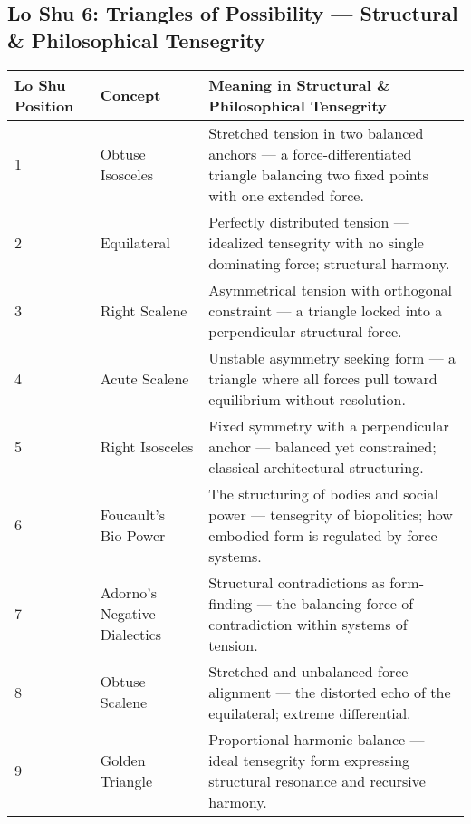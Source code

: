 \documentclass{article}
\begin{document}
\begin{landscape}

\section*{Lo Shu 6: Triangles of Possibility — Structural \& Philosophical Tensegrity}

\renewcommand{\arraystretch}{1.4}

\begin{tabular}{|p{1.8cm}|p{4.5cm}|p{9.5cm}|}
\hline
\textbf{Lo Shu Position} & 
\textbf{Concept} & 
\textbf{Meaning in Structural \& Philosophical Tensegrity} \\
\hline

1 & 
Obtuse Isosceles & 
Stretched tension in two balanced anchors — a force-differentiated triangle balancing two fixed points with one extended force. \\
\hline

2 & 
Equilateral & 
Perfectly distributed tension — idealized tensegrity with no single dominating force; structural harmony. \\
\hline

3 & 
Right Scalene & 
Asymmetrical tension with orthogonal constraint — a triangle locked into a perpendicular structural force. \\
\hline

4 & 
Acute Scalene & 
Unstable asymmetry seeking form — a triangle where all forces pull toward equilibrium without resolution. \\
\hline

5 & 
Right Isosceles & 
Fixed symmetry with a perpendicular anchor — balanced yet constrained; classical architectural structuring. \\
\hline

6 & 
Foucault’s Bio-Power & 
The structuring of bodies and social power — tensegrity of biopolitics; how embodied form is regulated by force systems. \\
\hline

7 & 
Adorno’s Negative Dialectics & 
Structural contradictions as form-finding — the balancing force of contradiction within systems of tension. \\
\hline

8 & 
Obtuse Scalene & 
Stretched and unbalanced force alignment — the distorted echo of the equilateral; extreme differential. \\
\hline

9 & 
Golden Triangle & 
Proportional harmonic balance — ideal tensegrity form expressing structural resonance and recursive harmony. \\
\hline

\end{tabular}

\end{landscape}
\end{document}
